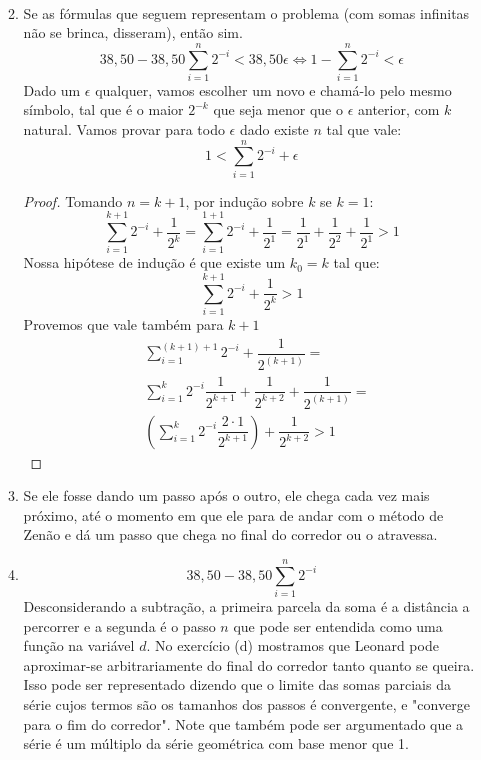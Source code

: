 \documentclass[english,ngerman,parskip=half]{scrartcl}
\begin{document}
\begin{enumerate}
\begin{enumerate}
\begin{align*}
                \end{align*}
            \item
                Se as fórmulas que seguem representam o problema (com somas infinitas não se brinca, disseram), então sim.
                $$ 38,50 - 38,50 \sum_{i=1}^n 2^{-i} < 38,50 \epsilon \iff 1 - \sum_{i=1}^n 2^{-i} < \epsilon $$
                Dado um $\epsilon$ qualquer, vamos escolher um novo e chamá-lo pelo mesmo símbolo, 
                tal que é o maior $2^{-k}$ que seja menor que o $\epsilon$ anterior, com $k$ natural.
                Vamos provar para todo $\epsilon$ dado existe $n$ tal que vale:
                $$1 < \sum_{i=1}^n 2^{-i} + \epsilon $$
                \begin{proof}
                Tomando $n = k+1$, por indução sobre $k$ se $k = 1$:
                $$\sum_{i=1}^{k+1} 2^{-i} + \dfrac{1}{2^k} =
                    \sum_{i=1}^{1+1} 2^{-i} + \dfrac{1}{2^1} =
                    \dfrac{1}{2^1} + \dfrac{1}{2^2} + \dfrac{1}{2^1} > 1 $$
                Nossa hipótese de indução é que existe um $k_0 = k$ tal que:
                $$ \sum_{i=1}^{k+1} 2^{-i} + \dfrac{1}{2^k} > 1$$ 
                Provemos que vale também para $k+1$
                \begin{align*}
                    & \sum_{i=1}^{(k+1)+1} 2^{-i} + \dfrac{1}{2^{(k+1)}} = \\
                    & \sum_{i=1}^{k} 2^{-i}\dfrac{1}{2^{k+1}} + \dfrac{1}{2^{k+2}} + \dfrac{1}{2^{(k+1)}} = \\
                    & \left( \sum_{i=1}^{k} 2^{-i} \dfrac{2 \cdot 1}{2^{k+1}} \right) + \dfrac{1}{2^{k+2}}  > 1
                \end{align*}
                \end{proof}
            \item
                Se ele fosse dando um passo após o outro, ele chega cada vez mais próximo, até o momento em que ele para de 
                andar com o método de Zenão e dá um passo que chega no final do corredor ou o atravessa.
            \item
                $$ 38,50 - 38,50 \sum_{i=1}^n 2^{-i} $$
                Desconsiderando a subtração, a primeira parcela da soma é a distância a percorrer e a 
                segunda é o passo $n$ que pode ser entendida como
                uma função na variável $d$.
                No exercício (d) mostramos que Leonard pode aproximar-se arbitrariamente do final do corredor tanto quanto
                se queira. Isso pode ser representado dizendo que o limite das somas parciais da série cujos termos são 
                os tamanhos dos passos é convergente, e "converge para o fim do corredor".
                Note que também pode ser argumentado que a série é um múltiplo da série geométrica com base menor que 1.
        \end{enumerate}
\end{enumerate}
\end{document}
